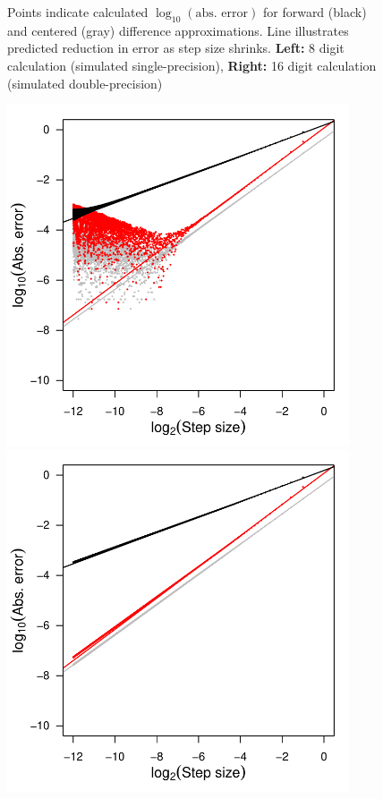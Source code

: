 \documentclass[12pt]{article}
\begin{document}
\begin{figure}[h!]
\begin{minipage}{0.48\textwidth}
\end{minipage}

\caption{Points indicate calculated \(\log_{10}\left(\text{abs. error}\right)\) for forward (black) and centered (gray) difference approximations.  Line illustrates predicted reduction in error as step size shrinks.  \textbf{Left:} 8 digit calculation (simulated single-precision),  \textbf{Right:} 16 digit calculation (simulated double-precision)}\label{fig::plots}
\end{figure}
%

\begin{figure}[h!]\centering
\begin{minipage}{0.48\textwidth}
\includegraphics[width=0.9\textwidth]{step_size_roundoff_8.pdf}

\end{minipage}
\begin{minipage}{0.48\textwidth}
\includegraphics[width=0.9\textwidth]{step_size_roundoff_16.pdf}


\end{minipage}
\end{figure}
\end{document}
